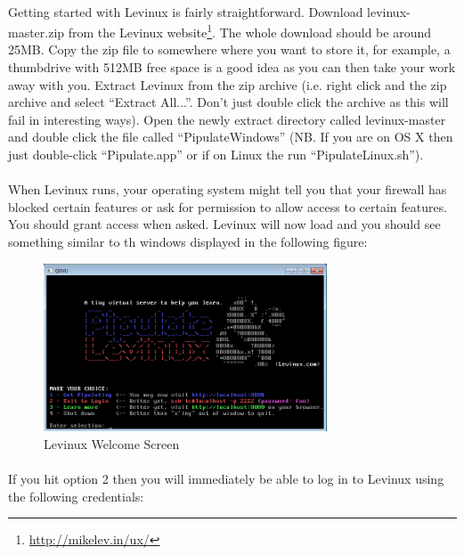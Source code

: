 \documentclass[12pt, a4paper, twoside]{book}
\begin{document}
\paragraph{} Getting started with Levinux is fairly straightforward. Download levinux-master.zip from the Levinux website\footnote{\url{http://mikelev.in/ux/}}. The whole download should be around 25MB. Copy the zip file to somewhere where you want to store it, for example, a thumbdrive with 512MB free space is a good idea as you can then take your work away with you. Extract Levinux from the zip archive (i.e. right click and the zip archive and select ``Extract All...''. Don't just double click the archive as this will fail in interesting ways). Open the newly extract directory called levinux-master and double click the file called ``PipulateWindows'' (NB. If you are on OS X then just double-click ``Pipulate.app'' or if on Linux the run ``PipulateLinux.sh'').

\paragraph{} When Levinux runs, your operating system might tell you that your firewall has blocked certain features or ask for permission to allow access to certain features. You should grant access when asked. Levinux will now load and you should see something similar to th windows displayed in the following figure:

\begin{figure}[H]
\centering
\includegraphics[width=0.75\textwidth]{images/levinux_welcome.png}
\caption{Levinux Welcome Screen}
\label{fig:levinux-welcome}
\end{figure}

\paragraph{} If you hit option 2 then you will immediately be able to log in to Levinux using the following credentials:
\end{document}
